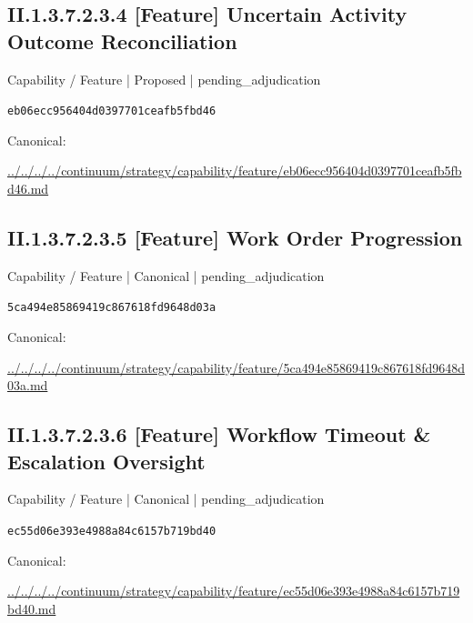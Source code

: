 \documentclass[10pt,a4paper]{article}
\begin{document}
\subsection*{II.1.3.7.2.3.4 [Feature] Uncertain Activity Outcome Reconciliation}
\label{element-eb06ecc956404d0397701ceafb5fbd46}
{\small Capability / Feature | Proposed | pending\_adjudication}\par
\texttt{eb06ecc956404d0397701ceafb5fbd46}\par
Canonical: \par
{\footnotesize\url{../../../../continuum/strategy/capability/feature/eb06ecc956404d0397701ceafb5fbd46.md}}\par
\subsection*{II.1.3.7.2.3.5 [Feature] Work Order Progression}
\label{element-5ca494e85869419c867618fd9648d03a}
{\small Capability / Feature | Canonical | pending\_adjudication}\par
\texttt{5ca494e85869419c867618fd9648d03a}\par
Canonical: \par
{\footnotesize\url{../../../../continuum/strategy/capability/feature/5ca494e85869419c867618fd9648d03a.md}}\par
\subsection*{II.1.3.7.2.3.6 [Feature] Workflow Timeout \& Escalation Oversight}
\label{element-ec55d06e393e4988a84c6157b719bd40}
{\small Capability / Feature | Canonical | pending\_adjudication}\par
\texttt{ec55d06e393e4988a84c6157b719bd40}\par
Canonical: \par
{\footnotesize\url{../../../../continuum/strategy/capability/feature/ec55d06e393e4988a84c6157b719bd40.md}}\par
\end{document}

